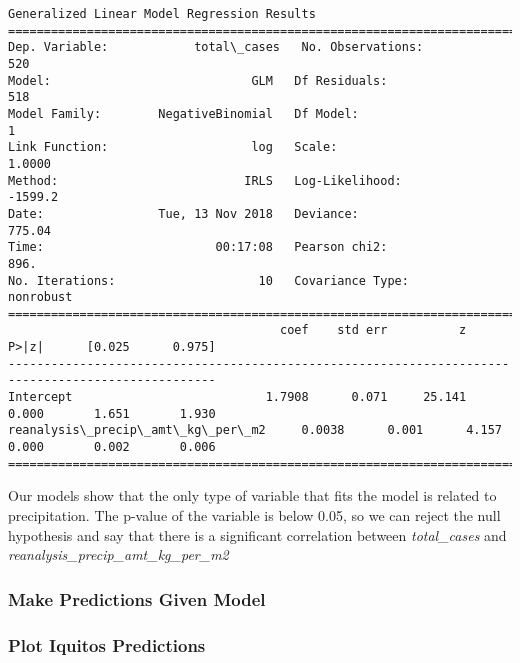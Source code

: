\documentclass[11pt]{article}
\begin{document}
    \begin{Verbatim}[commandchars=\\\{\}]
                 Generalized Linear Model Regression Results                  
==============================================================================
Dep. Variable:            total\_cases   No. Observations:                  520
Model:                            GLM   Df Residuals:                      518
Model Family:        NegativeBinomial   Df Model:                            1
Link Function:                    log   Scale:                          1.0000
Method:                          IRLS   Log-Likelihood:                -1599.2
Date:                Tue, 13 Nov 2018   Deviance:                       775.04
Time:                        00:17:08   Pearson chi2:                     896.
No. Iterations:                    10   Covariance Type:             nonrobust
===================================================================================================
                                      coef    std err          z      P>|z|      [0.025      0.975]
---------------------------------------------------------------------------------------------------
Intercept                           1.7908      0.071     25.141      0.000       1.651       1.930
reanalysis\_precip\_amt\_kg\_per\_m2     0.0038      0.001      4.157      0.000       0.002       0.006
===================================================================================================

    \end{Verbatim}

    Our models show that the only type of variable that fits the model is
related to precipitation. The p-value of the variable is below 0.05, so
we can reject the null hypothesis and say that there is a significant
correlation between \emph{total\_cases} and
\emph{reanalysis\_precip\_amt\_kg\_per\_m2}

    \subsubsection{Make Predictions Given
Model}\label{make-predictions-given-model}

    \subsubsection{Plot Iquitos Predictions}\label{plot-iquitos-predictions}
\end{document}
